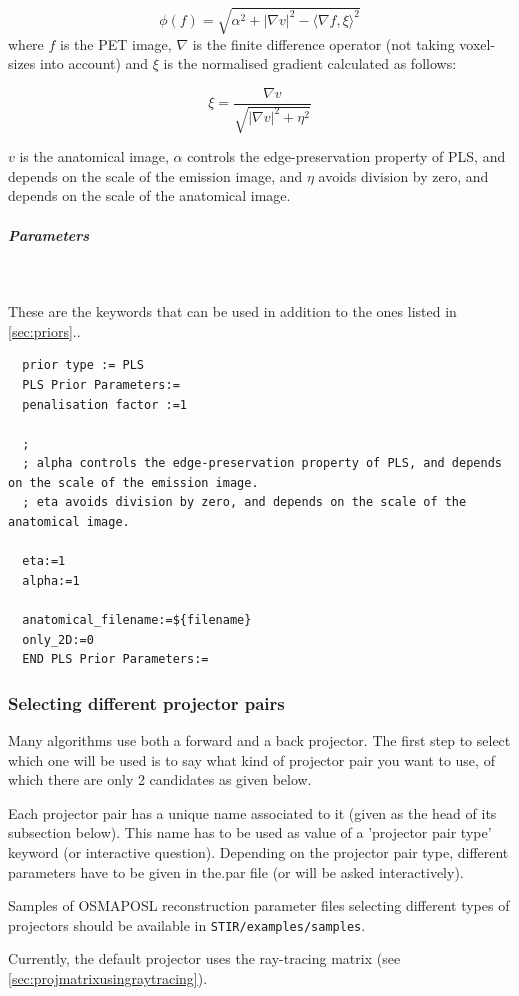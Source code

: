 \documentclass{article}
\newcommand{\subsubsubsubsection}[1]{\subparagraph{#1} \mbox{} \\}
\begin{document}
{{{  \[
  \phi(f) = \sqrt{\alpha^2 + |\nabla v|^2 - {\langle\nabla f,\xi\rangle}^2}
  \]
  where $ f $ is the PET image, $\nabla$ is the finite difference operator (\textrm{not} taking voxel-sizes into account) and
  $ \xi $ is the normalised gradient calculated as follows:

  \[
  \xi = \frac{\nabla v}{\sqrt{|\nabla v|^2 + \eta^2}}
  \]

  $ v $ is the anatomical image, $ \alpha $ controls the edge-preservation property of PLS, and depends on the scale of the emission image,
  and $ \eta $ avoids division by zero, and depends on the scale of the anatomical image. 
}
{ \subsubsubsubsection{Parameters}
}
  These are the keywords that can be used in addition to the ones listed in \ref{sec:priors}..
  \begin{verbatim}
  prior type := PLS
  PLS Prior Parameters:=
  penalisation factor :=1

  ; 
  ; alpha controls the edge-preservation property of PLS, and depends on the scale of the emission image. 
  ; eta avoids division by zero, and depends on the scale of the anatomical image. 

  eta:=1
  alpha:=1

  anatomical_filename:=${filename}
  only_2D:=0
  END PLS Prior Parameters:=
  \end{verbatim}

\subsubsection{
Selecting different projector pairs}
\label{sec:projectorpairs}
Many algorithms use both a forward and a back projector. The 
first step to select which one will be used is to say what kind 
of projector pair you want to use, of which there are only 2 
candidates as given below. 


Each projector pair has a unique name associated to it (given 
as the head of its subsection below). This name has to be used 
as value of a 'projector pair type' keyword (or interactive question). 
Depending on the projector pair type, different parameters have 
to be given in the.par file (or will be asked interactively).


Samples of OSMAPOSL reconstruction parameter files selecting 
different types of projectors should be available in \texttt{STIR/examples/samples}.

Currently, the default projector uses the ray-tracing matrix (see \ref{sec:projmatrixusingraytracing}).

}}
\end{document}
